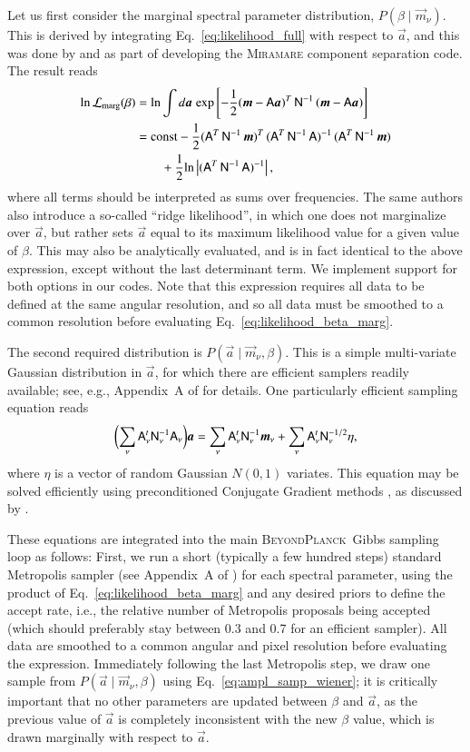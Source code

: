 \documentclass[twocolumn]{aa}
\newcommand{\A}[0]{\tens{A}}
\renewcommand{\a}[0]{\vec{a}}
\newcommand{\m}[0]{\vec{m}}
\newcommand{\N}[0]{\tens{N}}
\newcommand{\iN}[0]{\tens{N}^{-1}}
\newcommand{\BP}{\textsc{BeyondPlanck}}
\begin{document}
Let us first consider the marginal spectral parameter distribution,
$P(\beta\mid\m_{\nu})$. This is derived by integrating
Eq.~\eqref{eq:likelihood_full} with respect to $\a$, and this was done
by \citet{2009MNRAS.392..216S} and \citet{stivoli:2010} as part of developing the
\textsc{Miramare} component separation code. The result reads
 \begin{align}
   \mathrm{ln}\,\mathcal{L}_{\mathrm{marg}}(\beta) &= \mathrm{ln} \int d\a \; \mathrm{exp} \left[-\frac{1}{2}(\m-\A\a)^T\, \iN\, (\m-\A\a)\right] \nonumber \\
   &= \mathrm{const} -\frac{1}{2} (\A^T\,\iN\, \m)^T\, (\A^T\,\iN\, \A)^{-1}\,(\A^T\,\iN\, \m) \nonumber \\
   &\quad\quad+ \frac{1}{2}\mathrm{ln} \left| (\A^T\,\iN\, \A)^{-1}\right|,  \label{eq:likelihood_beta_marg}
\end{align}
where all terms should be interpreted as sums over frequencies. The
same authors also introduce a so-called ``ridge likelihood'', in which
one does not marginalize over $\a$, but rather sets $\a$ equal to its
maximum likelihood value for a given value of $\beta$. This may also
be analytically evaluated, and is in fact identical to the above
expression, except without the last determinant term. We implement
support for both options in our codes. Note that this expression
requires all data to be defined at the same angular resolution, and so
all data must be smoothed to a common resolution before evaluating
Eq.~\eqref{eq:likelihood_beta_marg}.

The second required distribution is $P(\a\mid\m_{\nu},\beta)$. This is a
simple multi-variate Gaussian distribution in $\a$, for which there
are efficient samplers readily available; see, e.g., Appendix~A of
\citet{bp01} for details. One particularly efficient sampling equation
reads
\begin{align}
  \biggl(\sum_{\nu}\A_{\nu}^t\N_{\nu}^{-1}\A_{\nu}\biggr)\a = \sum_{\nu}\A_{\nu}^t\N_{\nu}^{-1}\m_{\nu} + \sum_{\nu}\A_{\nu}^t\N_{\nu}^{-1/2}\eta,
\label{eq:ampl_samp_wiener}
\end{align}
where $\eta$ is a vector of random Gaussian $N(0,1)$
variates. This equation may be solved efficiently using preconditioned
Conjugate Gradient methods \citep{shewchuk:1994}, as discussed by
\citet{seljebotn:2019}. 

These equations are integrated into the main \BP\ Gibbs sampling loop
as follows: First, we run a short (typically a few hundred steps)
standard Metropolis sampler (see Appendix~A of \citealp{bp01}) for
each spectral parameter, using the product of
Eq.~\eqref{eq:likelihood_beta_marg} and any desired priors to define
the accept rate, i.e., the relative number of Metropolis proposals
being accepted (which should preferably stay between 0.3 and 0.7
for an efficient sampler).
All data are smoothed to a common angular and pixel
resolution before evaluating the expression. Immediately following the
last Metropolis step, we draw one sample from $P(\a\mid\m_{\nu},\beta)$
using Eq.~\eqref{eq:ampl_samp_wiener}; it is critically important that
no other parameters are updated between $\beta$ and $\a$, as the
previous value of $\a$ is completely inconsistent with the new $\beta$
value, which is drawn marginally with respect to $\a$.
\end{document}
